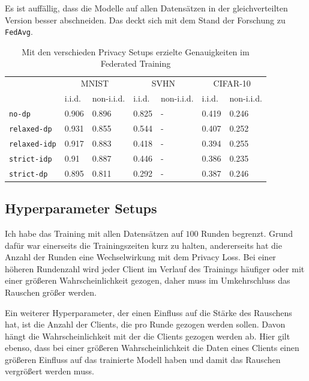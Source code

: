 Es ist auffällig, dass die Modelle auf allen Datensätzen in der gleichverteilten Version besser abschneiden. Das deckt sich mit dem Stand der Forschung zu \texttt{FedAvg}.

\begin{table}
	\centering
	\begin{tabular}{lp{4em}p{4em}p{4em}p{4em}p{4em}p{4em}}
		\toprule 
	 	& \multicolumn{2}{c}{MNIST} & \multicolumn{2}{c}{SVHN} & \multicolumn{2}{c}{CIFAR-10} \\
		\cmidrule(lr){2-3}\cmidrule(lr){4-5}\cmidrule(lr){6-7}
		& i.i.d. & non-i.i.d. & i.i.d. & non-i.i.d. & i.i.d. & non-i.i.d. \\
		\midrule
		\texttt{no-dp} & 0.906 & 0.896 & 0.825 & - & 0.419 & 0.246 \\
		\texttt{relaxed-dp} & 0.931 & 0.855 & 0.544 & - & 0.407 & 0.252 \\
		\texttt{relaxed-idp} & 0.917 & 0.883 & 0.418 & - & 0.394 & 0.255 \\
		\texttt{strict-idp} & 0.91 & 0.887 & 0.446 & - & 0.386 & 0.235 \\
		\texttt{strict-dp} & 0.895 & 0.811 & 0.292 & - & 0.387 & 0.246 \\
		\bottomrule
	\end{tabular}
	\caption{Mit den verschieden Privacy Setups erzielte Genauigkeiten im Federated Training}
	\label{tab:all-fed-results}
\end{table}

\subsection{Hyperparameter Setups}
Ich habe das Training mit allen Datensätzen auf $100$ Runden begrenzt. Grund dafür war einerseits die Trainingszeiten kurz zu halten, andererseits hat die Anzahl der Runden eine Wechselwirkung mit dem Privacy Loss. Bei einer höheren Rundenzahl wird jeder Client im Verlauf des Trainings häufiger oder mit einer größeren Wahrscheinlichkeit gezogen, daher muss im Umkehrschluss das Rauschen größer werden. 

Ein weiterer Hyperparameter, der einen Einfluss auf die Stärke des Rauschens hat, ist die Anzahl der Clients, die pro Runde gezogen werden sollen. Davon hängt die Wahrscheinlichkeit mit der die Clients gezogen werden ab. Hier gilt ebenso, dass bei einer größeren Wahrscheinlichkeit die Daten eines Clients einen größeren Einfluss auf das trainierte Modell haben und damit das Rauschen vergrößert werden muss.

